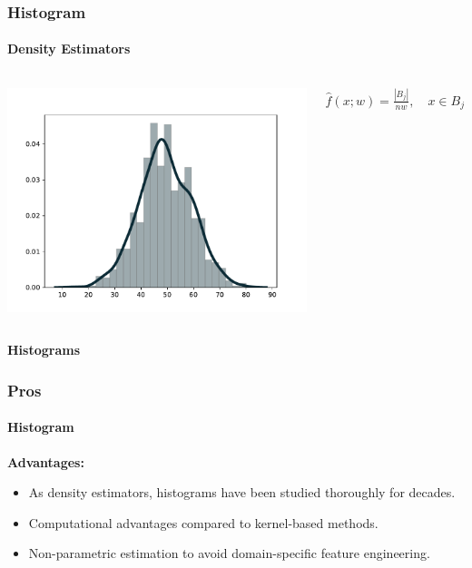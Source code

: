 \documentclass[mathserif]{beamer}
\begin{document}
    \begin{frame}
        \frametitle{Histogram}
        \framesubtitle{Density Estimators}

        \begin{columns}
            \centering
            \includegraphics[width=1\columnwidth]{res/histogram_pdf.pdf}

            $ \hat{f}(x; w) = \frac{\left|B_j\right|}{n w}, \quad x \in B_{j}$
        \end{columns}

    \end{frame}


    \begin{frame}
        \Huge \textbf{Histograms}
    \end{frame}


    \begin{frame}
        \frametitle{Pros}
        \framesubtitle{Histogram}

        {\Large \textbf{Advantages:}}
        \begin{itemize}
            \item As density estimators, histograms have been studied thoroughly for decades.
            \item Computational advantages compared to kernel-based methods.
            \item Non-parametric estimation to avoid domain-specific feature engineering.
        \end{itemize}


    \end{frame}
\end{document}
